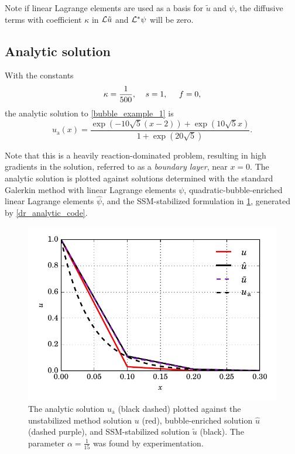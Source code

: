 Note if linear Lagrange elements are used as a basis for $\tilde{u}$ and $\psi$, the diffusive terms with coefficient $\kappa$ in $\mathcal{L} \tilde{u}$ and $\mathcal{L}^* \psi$ will be zero.

\subsection{Analytic solution}

With the constants
\begin{align*}
  \kappa = \frac{1}{500}, \hspace{4mm} s = 1, \hspace{5mm} f = 0,
\end{align*}
the analytic solution to \cref{bubble_example_1} is 
$$u_{\text{a}}(x) = \frac{\exp\left(-10\sqrt{5}(x-2)\right) + \exp\left(10 \sqrt{5}x\right)}{1 + \exp\left(20\sqrt{5}\right)}.$$

Note that this is a heavily reaction-dominated problem, resulting in high gradients in the solution, referred to as a  \emph{boundary layer}, near $x=0$.  The analytic solution is plotted against solutions determined with the standard Galerkin method with linear Lagrange elements $\psi$, quadratic-bubble-enriched linear Lagrange elements $\hat{\psi}$, and the SSM-stabilized formulation in \cref{dr_analytic_image}, generated by \cref{dr_analytic_code}.


\begin{figure}
  \centering
    \includegraphics[width=\linewidth]{images/bubbles/DR_analytic_new.pdf}
  \caption[Diffusion-reaction stabilization example]{The analytic solution $u_{\text{a}}$ (black dashed) plotted against the unstabilized method solution $u$ (red), bubble-enriched solution $\hat{u}$ (dashed purple), and SSM-stabilized solution $\tilde{u}$ (black).  The parameter $\alpha = \frac{1}{15}$ was found by experimentation.}
  \label{dr_analytic_image}
\end{figure}




